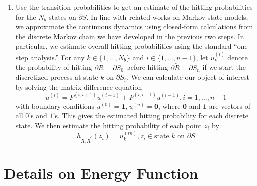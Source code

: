 \documentclass[12pt, nofootinbib,english, amsmath, amssymb, aps, priprint, graphicx,floatfix]{revtex4-1}
\theoremstyle{plain}
\theoremstyle{definition}
\theoremstyle{plain}
\begin{document}
{{{\begin{enumerate}
\item Use the transition probabilities to get an estimate of the hitting probabilities for the $N_b$ states on
  $\partial S$.  In line with related works on Markov state models,\cite{Pande2010-yi, Chodera2014-bh, Husic2018-xp} we  approximate the continuous dynamics using closed-form calculations from the discrete Markov chain we have developed in the previous two steps.  In particular, we estimate overall hitting probabilities using the standard ``one-step analysis.'' For any $k \in \{ 1, \ldots, N_b \}$ and $i \in \{ 1, \ldots, n - 1 \}$, let $u^{(i)}_k$ denote the probability of hitting $\partial R = \partial S_0$ before hitting $\partial \tilde{R} = \partial S_n$ if we start the discretized process at state $k$ on $\partial S_i$.  We can calculate our object of interest by solving the matrix difference equation \[ u^{(i)} = P^{(i, i + 1)} u^{(i + 1)} + P^{(i, i - 1)} u^{(i - 1)}, i = 1, \ldots, n - 1 \] with boundary conditions $u^{(0)} = {\mathbf{1}}, u^{(n)} = {\mathbf{0} }$, where ${\mathbf{0}}$ and ${\mathbf{1}}$ are vectors of all $0$'s and $1$'s. This gives the estimated hitting probability for each discrete state.  We then estimate the hitting probability of each point $z_i$ by
  \begin{equation}
      \label{equ:hitprobest}
  h_{R,\tilde R^c}(z_i) = u^{(m)}_k, z_i \in \text{state }k\text{ on }\partial S\end{equation}
\end{enumerate}
}}

%
%
%
%
%
%
%
%
%

\section{Details on Energy Function} \label{sec:energy_function}

}
\end{document}
